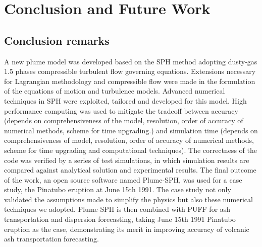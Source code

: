 \chapter{Conclusion and Future Work} \label{chapter:Future-Work}

\section{Conclusion remarks}
A new plume model was developed based on the SPH method adopting dusty-gas 1.5 phases compressible turbulent flow governing equations. Extensions necessary for Lagrangian methodology and compressible flow were made in the formulation of the equations of motion and turbulence models. Advanced numerical techniques in SPH were exploited, tailored and developed for this model. High performance computing was used to mitigate the tradeoff between accuracy (depends on comprehensiveness of the model, resolution, order of accuracy of numerical methods, scheme for time upgrading.) and simulation time (depends on comprehensiveness of model, resolution, order of accuracy of numerical methods, scheme for time upgrading and computational techniques). The correctness of the code was verified by a series of test simulations, in which simulation results are compared against analytical solution and experimental results. The final outcome of the work, an open source software named Plume-SPH, was used for a case study, the Pinatubo eruption at June 15th 1991. The case study not only validated the assumptions made to simplify the physics but also these numerical techniques we adopted. Plume-SPH is then combined with PUFF for ash transportation and dispersion forecasting, taking June 15th 1991 Pinatubo eruption as the case, demonstrating its merit in improving accuracy of volcanic ash transportation forecasting.

